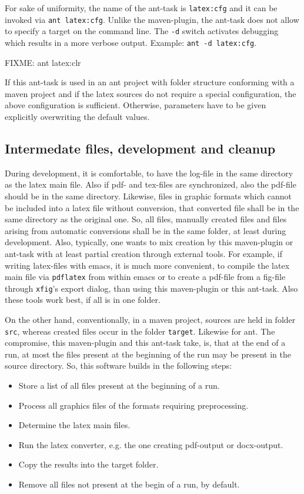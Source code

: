 \documentclass[12pt]{article}
\begin{document}
For sake of uniformity, 
the name of the ant-task is {\tt latex:cfg} 
and it can be invoked via {\tt ant latex:cfg}. 
Unlike the maven-plugin, the ant-task 
does not allow to specify a target on the command line. 
The {\tt -d} switch activates debugging 
which results in a more verbose output. 
Example: {\tt ant -d latex:cfg}. 

FIXME: ant latex:clr 

If this ant-task is used in an ant project 
with folder structure conforming with a maven project 
and if the latex sources do not require a special configuration, 
the above configuration is sufficient. 
Otherwise, parameters have to be given explicitly 
overwriting the default values. 

\subsection{Intermedate files, development and cleanup}\label{subsec:devel}

During development, it is comfortable, 
to have the log-file in the same directory as the latex main file. 
Also if pdf- and tex-files are synchronized, 
also the pdf-file should be in the same directory. 
Likewise, files in graphic formats 
which cannot be included into a latex file without conversion, 
that converted file shall be in the same directory as the original one. 
So, all files, manually created files 
and files arising from automatic conversions 
shall be in the same folder, at least during development. 
Also, typically, one wants to mix creation by this maven-plugin or ant-task 
with at least partial creation through external tools. 
For example, if writing latex-files with emacs, 
it is much more convenient, to compile the latex main file 
via {\tt pdflatex} from within emacs 
or to create a pdf-file from a fig-file through {\tt xfig}'s export dialog, 
than using this maven-plugin or this ant-task. 
Also these tools work best, if all is in one folder. 

On the other hand, 
conventionally, in a maven project, 
sources are held in folder {\tt src}, 
whereas created files occur in the folder {\tt target}. 
Likewise for ant. 
The compromise, this maven-plugin and this ant-task take, 
is, that at the end of a run, 
at most the files present at the beginning of the run 
may be present in the source directory. 
So, this software builds in the following steps: 
%
\begin{itemize}
\item
Store a list of all files present at the beginning of a run.
\item
Process all graphics files of the formats requiring preprocessing.
\item
Determine the latex main files.
\item
Run the latex converter, e.g. the one creating pdf-output or docx-output.
\item
Copy the results into the target folder.
\item
Remove all files not present at the begin of a run, by default. 
\end{itemize}
\end{document}
